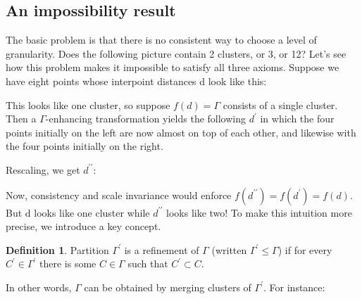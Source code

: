 \documentclass[letterpaper,10pt]{article}
\theoremstyle{definition}
\newtheorem{definition}{Definition}
\theoremstyle{plain}
\begin{document}
\subsection{An impossibility result}
The basic problem is that there is no consistent way to choose a level of granularity. Does the following picture contain 2 clusters, or 3, or 12? Let's see how this problem makes it impossible to satisfy all three axioms. Suppose we have eight points whose interpoint distances d look like this:


This looks like one cluster, so suppose $f(d)=\Gamma$ consists of a single cluster. Then a $\Gamma$-enhancing transformation yields the following $d^{\prime}$ in which the four points initially on the left are now almost on top of each other, and likewise with the four points initially on the right.


Rescaling, we get $d^{\prime\prime}:$


Now, consistency and scale invariance would enforce $f(d^{\prime\prime})=f(d^{\prime})=f(d)$. But d looks like one cluster while $d^{\prime\prime}$ looks like two! To make this intuition more precise, we introduce a key concept.

\begin{definition}
Partition $\Gamma^{\prime}$ is a refinement of $\Gamma$ (written $\Gamma^{\prime}\le\Gamma$) if for every $C^{\prime}\in\Gamma^{\prime}$ there is some $C\in\Gamma$ such that $C^{\prime}\subset C$.
\end{definition}
In other words, $\Gamma$ can be obtained by merging clusters of $\Gamma^{\prime}$. For instance:
\end{document}

